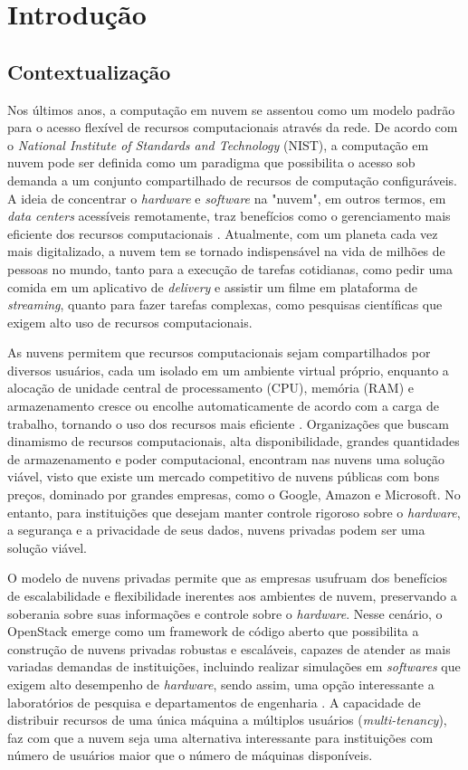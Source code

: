 \chapter{Introdução}

\section{Contextualização}

Nos últimos anos, a computação em nuvem se assentou como um modelo padrão para o acesso flexível de recursos computacionais através da rede. De acordo com o \textit{National Institute of Standards and Technology} (NIST), a computação em nuvem pode ser definida como um paradigma que possibilita o acesso sob demanda a um conjunto compartilhado de recursos de computação configuráveis. A ideia de concentrar o \textit{hardware} e \textit{software} na "nuvem", em outros termos, em \textit{data centers} acessíveis remotamente, traz benefícios como o gerenciamento mais eficiente dos recursos computacionais \cite{mell2011}. Atualmente, com um planeta cada vez mais digitalizado, a nuvem tem se tornado indispensável na vida de milhões de pessoas no mundo, tanto para a execução de tarefas cotidianas, como pedir uma comida em um aplicativo de \textit{delivery} e assistir um filme em plataforma de \textit{streaming}, quanto para fazer tarefas complexas, como pesquisas científicas que exigem alto uso de recursos computacionais.

As nuvens permitem que recursos computacionais sejam compartilhados por diversos usuários, cada um isolado em um ambiente virtual próprio, enquanto a alocação de unidade central de processamento (CPU), memória (RAM) e armazenamento cresce ou encolhe automaticamente de acordo com a carga de trabalho, tornando o uso dos recursos mais eficiente \cite{dai2015, ray2013}. Organizações que buscam dinamismo de recursos computacionais, alta disponibilidade, grandes quantidades de armazenamento e poder computacional, encontram nas nuvens uma solução viável, visto que existe um mercado competitivo de nuvens públicas com bons preços, dominado por grandes empresas, como o Google, Amazon e Microsoft. No entanto, para instituições que desejam manter controle rigoroso sobre o \textit{hardware}, a segurança e a privacidade de seus dados, nuvens privadas podem ser uma solução viável.

O modelo de nuvens privadas permite que as empresas usufruam dos benefícios de escalabilidade e flexibilidade inerentes aos ambientes de nuvem, preservando a soberania sobre suas informações e controle sobre o \textit{hardware}. Nesse cenário, o OpenStack emerge como um framework de código aberto que possibilita a construção de nuvens privadas robustas e escaláveis, capazes de atender as mais variadas demandas de instituições, incluindo realizar simulações em \textit{softwares} que exigem alto desempenho de \textit{hardware}, sendo assim, uma opção interessante a laboratórios de pesquisa e departamentos de engenharia \cite{heuchert2021}. A capacidade de distribuir recursos de uma única máquina a múltiplos usuários (\textit{multi-tenancy}), faz com que a nuvem seja uma alternativa interessante para instituições com número de usuários maior que o número de máquinas disponíveis.


